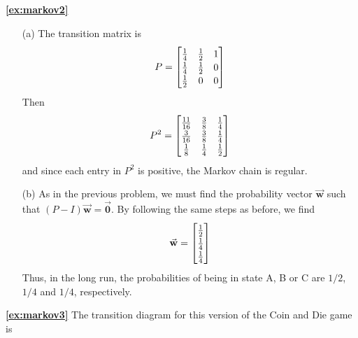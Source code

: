 \documentclass[reqno]{immbook}
\newcommand{\BW}{\vec{\textbf{w}}}
\newcommand{\BZero}{\vec{\textbf{0}}}  %
\newcommand{\T}{\rule{0pt}{2.6ex}}
\newcommand{\B}{\rule[-1.2ex]{0pt}{0pt}}
\numberwithin{equation}{chapter}
\numberwithin{question}{section}
\numberwithin{theorem}{chapter}
\numberwithin{figure}{chapter}
\theoremstyle{definition}
\begin{document}
\textbf{\ref{ex:markov2}}
\begin{enumerate}
\item[(a)] The transition matrix is
\[
  P = \begin{bmatrix}
           \frac{1}{4}  & \frac{1}{2} & 1 \T\B \\
	   \frac{1}{4}  & \frac{1}{2} & 0 \B \\
	   \frac{1}{2}  & 0   & 0 \B
      \end{bmatrix}
\]
Then
\[
  P^2 = \begin{bmatrix}
           \frac{11}{16}  & \frac{3}{8} & \frac{1}{4} \T\B \\
	   \frac{3}{16}  & \frac{3}{8} & \frac{1}{4} \B \\
	   \frac{1}{8}  & \frac{1}{4}   & \frac{1}{2} \B
      \end{bmatrix}
\]
and since each entry in $P^2$ is positive, the Markov chain
is regular.
\item[(b)]  As in the previous problem, we must find the probability
vector $\BW$ such that $(P-I)\BW=\BZero$.
By following the same steps as before, we find
\[
   \BW = \begin{bmatrix}
            \frac{1}{2} \T\B \\ \frac{1}{4} \B \\ \frac{1}{4} \B \\
         \end{bmatrix}
\]
Thus, in the long run, the probabilities of being in state A, B or C
are $1/2$, $1/4$ and $1/4$, respectively.
\end{enumerate}

\medskip
\textbf{\ref{ex:markov3}}
The transition diagram for this version of the Coin and Die game is
\end{document}
